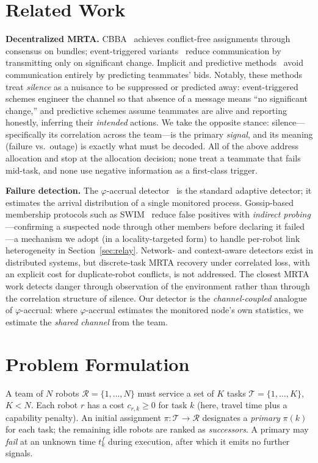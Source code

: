 \documentclass[conference]{IEEEtran}
\begin{document}
\section{Related Work}
\textbf{Decentralized MRTA.} CBBA~\cite{cbba} achieves conflict-free
assignments through consensus on bundles; event-triggered
variants~\cite{cbbaetc,edcbba} reduce communication by transmitting only on
significant change. Implicit and predictive
methods~\cite{formica,implicit} avoid communication entirely by predicting
teammates' bids. Notably, these methods treat \emph{silence} as a nuisance to be
suppressed or predicted away: event-triggered schemes engineer the channel so
that absence of a message means ``no significant change,'' and predictive
schemes assume teammates are alive and reporting honestly, inferring their
\emph{intended} actions. We take the opposite stance: silence---specifically its
correlation across the team---is the primary \emph{signal}, and its meaning
(failure vs.\ outage) is exactly what must be decoded. All of the above address
allocation and stop at the allocation decision; none treat a teammate that fails
mid-task, and none use negative information as a first-class trigger.

\textbf{Failure detection.} The $\varphi$-accrual
detector~\cite{phiaccrual} is the standard adaptive detector; it estimates the
arrival distribution of a single monitored process. Gossip-based membership
protocols such as SWIM~\cite{swim} reduce false positives with \emph{indirect
probing}---confirming a suspected node through other members before declaring it
failed---a mechanism we adopt (in a locality-targeted form) to handle per-robot
link heterogeneity in Section~\ref{sec:relay}. Network- and context-aware
detectors exist in distributed systems, but discrete-task MRTA recovery under
correlated loss, with an explicit cost for duplicate-robot conflicts, is not
addressed. The closest MRTA work detects danger through observation of the
environment rather than through the correlation structure of silence. Our
detector is the \emph{channel-coupled} analogue of $\varphi$-accrual: where
$\varphi$-accrual estimates the monitored node's own statistics, we estimate the
\emph{shared channel} from the team.

\section{Problem Formulation}
A team of $N$ robots $\mathcal{R}=\{1,\dots,N\}$ must service a set of
$K$ tasks $\mathcal{T}=\{1,\dots,K\}$, $K<N$. Each robot $r$ has a cost
$c_{r,k}\ge 0$ for task $k$ (here, travel time plus a capability penalty).
An initial assignment $\pi:\mathcal{T}\!\to\!\mathcal{R}$ designates a
\emph{primary} $\pi(k)$ for each task; the remaining idle robots are ranked as
\emph{successors}. A primary may \emph{fail} at an unknown time $t^{f}_{k}$
during execution, after which it emits no further signals.
\end{document}
